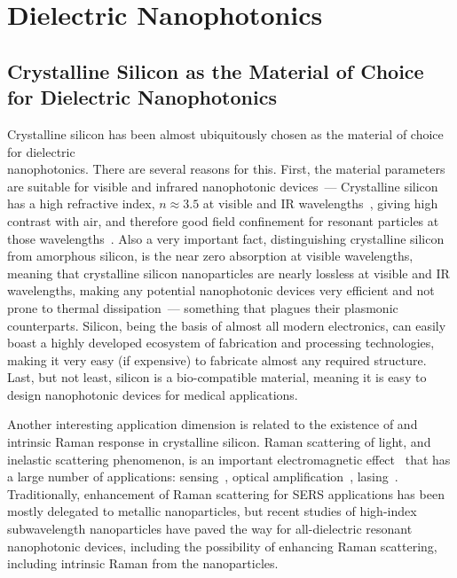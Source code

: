 \section{Dielectric Nanophotonics}
\label{ch:DielectricNanophotoics}

    \subsection{Crystalline Silicon as the Material of Choice for Dielectric Nanophotonics}
            Crystalline silicon has been almost ubiquitously chosen as the material of choice for dielectric \\nanophotonics.
        There are several reasons for this. First, the material parameters are suitable for visible and infrared nanophotonic devices~---
        Crystalline silicon has a high refractive index, $n \approx 3.5$ at visible and IR wavelengths~\cite{li1980refractive}, giving high contrast
        with air, and therefore good field confinement for resonant particles at those wavelengths~\cite{mie1908beitrage,dmitriev2016resonant}. Also
        a very important fact, distinguishing crystalline silicon from amorphous silicon, is the near zero absorption at visible wavelengths, meaning
        that crystalline silicon nanoparticles are nearly lossless at visible and IR wavelengths, making any potential nanophotonic devices very
        efficient and not prone to thermal dissipation~--- something that plagues their plasmonic counterparts.
            Silicon, being the basis of almost all modern electronics, can easily boast a highly developed ecosystem of fabrication and processing
        technologies, making it very easy (if expensive) to fabricate almost any required structure.
            Last, but not least, silicon is a bio-compatible material, meaning it is easy to design nanophotonic devices for medical applications.

            Another interesting application dimension is related to the existence of and intrinsic Raman response in crystalline silicon. Raman
        scattering of light, and inelastic scattering phenomenon, is an important electromagnetic effect~\cite{hayes2012scattering} that has a large number of applications:
        sensing~\cite{moskovits1985surface}, optical amplification~\cite{islam2004wideband}, lasing~\cite{pask2003design}.
        Traditionally, enhancement of Raman scattering for SERS applications has been mostly delegated to metallic nanoparticles, but
        recent studies of high-index subwavelength nanoparticles have paved the way for all-dielectric resonant nanophotonic devices, including
        the possibility of enhancing Raman scattering, including intrinsic Raman from the nanoparticles.

